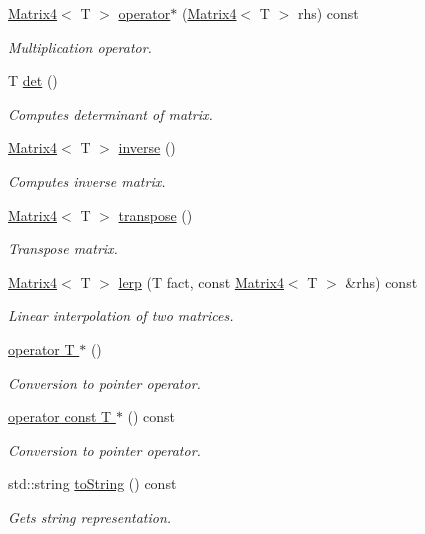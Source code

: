 \begin{DoxyCompactItemize}
\hyperlink{class_matrix4}{Matrix4}$<$ T $>$ \hyperlink{class_matrix4_afe91d8df25ea2a6b631cbcb288996c5d}{operator$\ast$} (\hyperlink{class_matrix4}{Matrix4}$<$ T $>$ rhs) const 
\begin{DoxyCompactList}\small\item\em Multiplication operator. \item\end{DoxyCompactList}\item 
T \hyperlink{class_matrix4_a1c124a69945d5913abff0a17990f17d0}{det} ()
\begin{DoxyCompactList}\small\item\em Computes determinant of matrix. \item\end{DoxyCompactList}\item 
\hyperlink{class_matrix4}{Matrix4}$<$ T $>$ \hyperlink{class_matrix4_a8412458379c9a664437d74e6a1a28443}{inverse} ()
\begin{DoxyCompactList}\small\item\em Computes inverse matrix. \item\end{DoxyCompactList}\item 
\hyperlink{class_matrix4}{Matrix4}$<$ T $>$ \hyperlink{class_matrix4_af58e316035425ba563a23e3b8f53c73c}{transpose} ()
\begin{DoxyCompactList}\small\item\em Transpose matrix. \item\end{DoxyCompactList}\item 
\hyperlink{class_matrix4}{Matrix4}$<$ T $>$ \hyperlink{class_matrix4_a0d895fccd560d767e9b6c672b806d8f5}{lerp} (T fact, const \hyperlink{class_matrix4}{Matrix4}$<$ T $>$ \&rhs) const 
\begin{DoxyCompactList}\small\item\em Linear interpolation of two matrices. \item\end{DoxyCompactList}\item 
\hyperlink{class_matrix4_aaac5f73c7974eee0056d4e4379d6465a}{operator T $\ast$} ()
\begin{DoxyCompactList}\small\item\em Conversion to pointer operator. \item\end{DoxyCompactList}\item 
\hyperlink{class_matrix4_acd9956981d8c1a19a003373893520ca5}{operator const T $\ast$} () const 
\begin{DoxyCompactList}\small\item\em Conversion to pointer operator. \item\end{DoxyCompactList}\item 
std::string \hyperlink{class_matrix4_a1121fd84f7636290ae1e2fb7ac6c6c9c}{toString} () const 
\begin{DoxyCompactList}\small\item\em Gets string representation. \item\end{DoxyCompactList}\end{DoxyCompactItemize}
